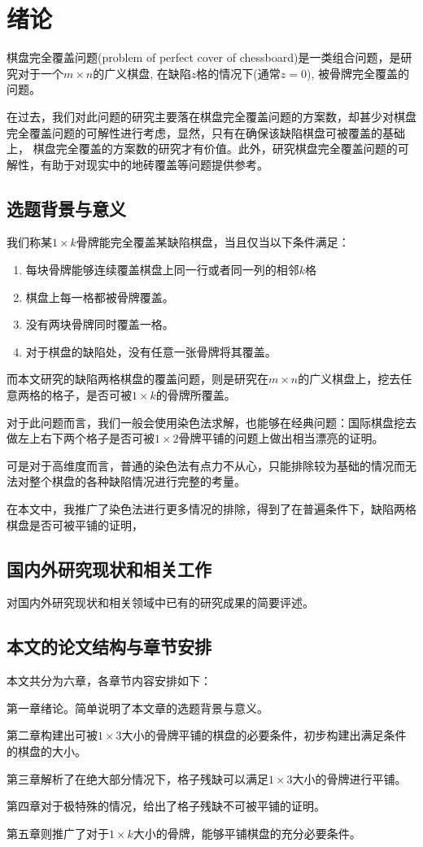 \chapter{绪论}
棋盘完全覆盖问题(problem of perfect cover of chessboard)是一类组合问题，是研究对于一个$m \times n$的广义棋盘, 在缺陷$z$格的情况下(通常$z=0$), 被骨牌完全覆盖的问题。

在过去，我们对此问题的研究主要落在棋盘完全覆盖问题的方案数，却甚少对棋盘完全覆盖问题的可解性进行考虑，显然，只有在确保该缺陷棋盘可被覆盖的基础上，
棋盘完全覆盖的方案数的研究才有价值。此外，研究棋盘完全覆盖问题的可解性，有助于对现实中的地砖覆盖等问题提供参考。

\section{选题背景与意义}
\label{sec:background}
我们称某$1 \times k$骨牌能完全覆盖某缺陷棋盘，当且仅当以下条件满足：
\begin{enumerate}
    \item 每块骨牌能够连续覆盖棋盘上同一行或者同一列的相邻$k$格
    \item 棋盘上每一格都被骨牌覆盖。
    \item 没有两块骨牌同时覆盖一格。
    \item 对于棋盘的缺陷处，没有任意一张骨牌将其覆盖。
\end{enumerate}

而本文研究的缺陷两格棋盘的覆盖问题，则是研究在$m \times n$的广义棋盘上，挖去任意两格的格子，是否可被$1 \times k$的骨牌所覆盖。

对于此问题而言，我们一般会使用染色法求解，也能够在经典问题：国际棋盘挖去做左上右下两个格子是否可被$1 \times 2$骨牌平铺的问题上做出相当漂亮的证明。

可是对于高维度而言，普通的染色法有点力不从心，只能排除较为基础的情况而无法对整个棋盘的各种缺陷情况进行完整的考量。

在本文中，我推广了染色法进行更多情况的排除，得到了在普遍条件下，缺陷两格棋盘是否可被平铺的证明，

\section{国内外研究现状和相关工作}
\label{sec:related_work}
对国内外研究现状和相关领域中已有的研究成果的简要评述。
\section{本文的论文结构与章节安排}

\label{sec:arrangement}

本文共分为六章，各章节内容安排如下：

第一章绪论。简单说明了本文章的选题背景与意义。

第二章构建出可被$1 \times 3$大小的骨牌平铺的棋盘的必要条件，初步构建出满足条件的棋盘的大小。

第三章解析了在绝大部分情况下，格子残缺可以满足$1 \times 3$大小的骨牌进行平铺。

第四章对于极特殊的情况，给出了格子残缺不可被平铺的证明。

第五章则推广了对于$1 \times k$大小的骨牌，能够平铺棋盘的充分必要条件。

